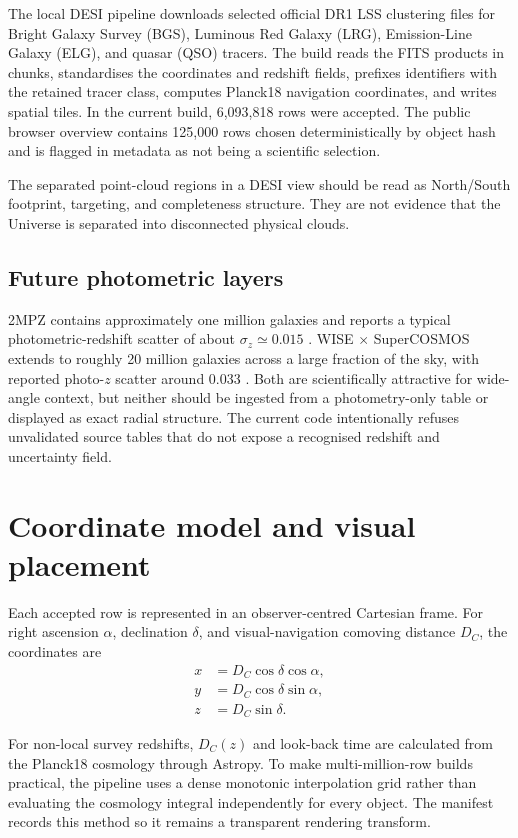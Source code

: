 \documentclass[11pt,a4paper]{article}
\begin{document}
The local DESI pipeline downloads selected official DR1 LSS clustering files for Bright Galaxy Survey (BGS), Luminous Red Galaxy (LRG), Emission-Line Galaxy (ELG), and quasar (QSO) tracers. The build reads the FITS products in chunks, standardises the coordinates and redshift fields, prefixes identifiers with the retained tracer class, computes Planck18 navigation coordinates, and writes spatial tiles. In the current build, 6,093,818 rows were accepted. The public browser overview contains 125,000 rows chosen deterministically by object hash and is flagged in metadata as not being a scientific selection.

The separated point-cloud regions in a DESI view should be read as North/South footprint, targeting, and completeness structure. They are not evidence that the Universe is separated into disconnected physical clouds.

\subsection{Future photometric layers}

2MPZ contains approximately one million galaxies and reports a typical photometric-redshift scatter of about $\sigma_z \simeq 0.015$ \cite{Bilicki2014}. WISE $\times$ SuperCOSMOS extends to roughly 20 million galaxies across a large fraction of the sky, with reported photo-$z$ scatter around $0.033$ \cite{Bilicki2016}. Both are scientifically attractive for wide-angle context, but neither should be ingested from a photometry-only table or displayed as exact radial structure. The current code intentionally refuses unvalidated source tables that do not expose a recognised redshift and uncertainty field.

\section{Coordinate model and visual placement}

Each accepted row is represented in an observer-centred Cartesian frame. For right ascension $\alpha$, declination $\delta$, and visual-navigation comoving distance $D_C$, the coordinates are
\begin{align}
x &= D_C\cos\delta\cos\alpha,\\
y &= D_C\cos\delta\sin\alpha,\\
z &= D_C\sin\delta.
\end{align}

For non-local survey redshifts, $D_C(z)$ and look-back time are calculated from the Planck18 cosmology through Astropy. To make multi-million-row builds practical, the pipeline uses a dense monotonic interpolation grid rather than evaluating the cosmology integral independently for every object. The manifest records this method so it remains a transparent rendering transform.
\end{document}
